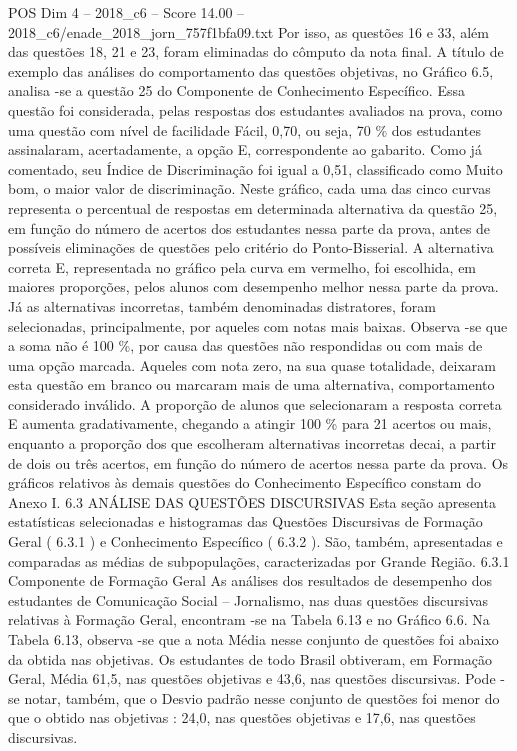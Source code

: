 \begin{textsample}{POS Dim 4 – 2018\_c6 – Score 14.00 – 2018\_c6/enade\_2018\_jorn\_757f1bfa09.txt}
Por isso, as questões 16 e 33, além das questões 18, 21 e 23, foram eliminadas do cômputo da nota final.
A título de exemplo das análises do comportamento das questões objetivas, no Gráfico 6.5, analisa -se a questão 25 do Componente de Conhecimento Específico.
Essa questão foi considerada, pelas respostas dos estudantes avaliados na prova, como uma questão com nível de facilidade Fácil, 0,70, ou seja, 70 \% dos estudantes assinalaram, acertadamente, a opção E, correspondente ao gabarito.
Como já comentado, seu Índice de Discriminação foi igual a 0,51, classificado como Muito bom, o maior valor de discriminação.
Neste gráfico, cada uma das cinco curvas representa o percentual de respostas em determinada alternativa da questão 25, em função do número de acertos dos estudantes nessa parte da prova, antes de possíveis eliminações de questões pelo critério do Ponto-Bisserial.
A alternativa correta E, representada no gráfico pela curva em vermelho, foi escolhida, em maiores proporções, pelos alunos com desempenho melhor nessa parte da prova.
Já as alternativas incorretas, também denominadas distratores, foram selecionadas, principalmente, por aqueles com notas mais baixas.
Observa -se que a soma não é 100 \%, por causa das questões não respondidas ou com mais de uma opção marcada.
Aqueles com nota zero, na sua quase totalidade, deixaram esta questão em branco ou marcaram mais de uma alternativa, comportamento considerado inválido.
A proporção de alunos que selecionaram a resposta correta E aumenta gradativamente, chegando a atingir 100 \% para 21 acertos ou mais, enquanto a proporção dos que escolheram alternativas incorretas decai, a partir de dois ou três acertos, em função do número de acertos nessa parte da prova.
Os gráficos relativos às demais questões do Conhecimento Específico constam do Anexo I. 6.3 ANÁLISE DAS QUESTÕES DISCURSIVAS Esta seção apresenta estatísticas selecionadas e histogramas das Questões Discursivas de Formação Geral ( 6.3.1 ) e Conhecimento Específico ( 6.3.2 ).
São, também, apresentadas e comparadas as médias de subpopulações, caracterizadas por Grande Região. 6.3.1 Componente de Formação Geral As análises dos resultados de desempenho dos estudantes de Comunicação Social – Jornalismo, nas duas questões discursivas relativas à Formação Geral, encontram -se na Tabela 6.13 e no Gráfico 6.6.
Na Tabela 6.13, observa -se que a nota Média nesse conjunto de questões foi abaixo da obtida nas objetivas.
Os estudantes de todo Brasil obtiveram, em Formação Geral, Média 61,5, nas questões objetivas e 43,6, nas questões discursivas.
Pode -se notar, também, que o Desvio padrão nesse conjunto de questões foi menor do que o obtido nas objetivas : 24,0, nas questões objetivas e 17,6, nas questões discursivas.

\end{textsample}
